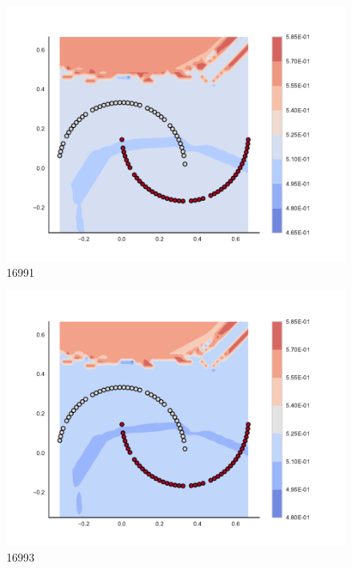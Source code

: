 \begin{subfigure}[b]{0.09\textwidth}
    \includegraphics[clip, trim=2.35cm 1.75cm 4.5cm 0cm,width=\textwidth]{img/convergence/16991.pdf}
    \caption{16991}
    \label{fig:convergence_16991}
\end{subfigure}
%
\begin{subfigure}[b]{0.09\textwidth}
    \includegraphics[clip, trim=2.35cm 1.75cm 4.5cm 0cm,width=\textwidth]{img/convergence/16993.pdf}
    \caption{16993}
    \label{fig:convergence_16993}
\end{subfigure}
%
